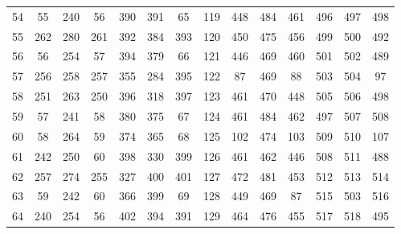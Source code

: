 \begin{apendicesenv}
\begin{table}[H]
\begin{tabular}{@{}ccccccc@{\hspace{1.0cm}}ccccccc@{}}
		54 &   55 &  240 &   56 &  390 &  391 &   65 & 119 &  448 &  484 &  461 &  496 &  497 &  498 \\
		55 &  262 &  280 &  261 &  392 &  384 &  393 & 120 &  450 &  475 &  456 &  499 &  500 &  492 \\
		56 &   56 &  254 &   57 &  394 &  379 &   66 & 121 &  446 &  469 &  460 &  501 &  502 &  489 \\
		57 &  256 &  258 &  257 &  355 &  284 &  395 & 122 &   87 &  469 &   88 &  503 &  504 &   97 \\
		58 &  251 &  263 &  250 &  396 &  318 &  397 & 123 &  461 &  470 &  448 &  505 &  506 &  498 \\
		59 &   57 &  241 &   58 &  380 &  375 &   67 & 124 &  461 &  484 &  462 &  497 &  507 &  508 \\
		60 &   58 &  264 &   59 &  374 &  365 &   68 & 125 &  102 &  474 &  103 &  509 &  510 &  107 \\
		61 &  242 &  250 &   60 &  398 &  330 &  399 & 126 &  461 &  462 &  446 &  508 &  511 &  488 \\
		62 &  257 &  274 &  255 &  327 &  400 &  401 & 127 &  472 &  481 &  453 &  512 &  513 &  514 \\
		63 &   59 &  242 &   60 &  366 &  399 &   69 & 128 &  449 &  469 &   87 &  515 &  503 &  516 \\
		64 &  240 &  254 &   56 &  402 &  394 &  391 & 129 &  464 &  476 &  455 &  517 &  518 &  495  \\
		\bottomrule
	\end{tabular}
	\label{tab:apendiceA_conectividade}
\end{table}


\end{apendicesenv}
